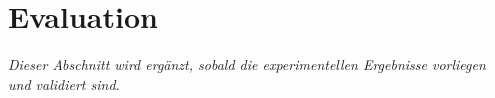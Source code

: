 \section{Evaluation}\label{evaluation}

\textit{Dieser Abschnitt wird ergänzt, sobald die experimentellen Ergebnisse vorliegen und validiert sind.}
